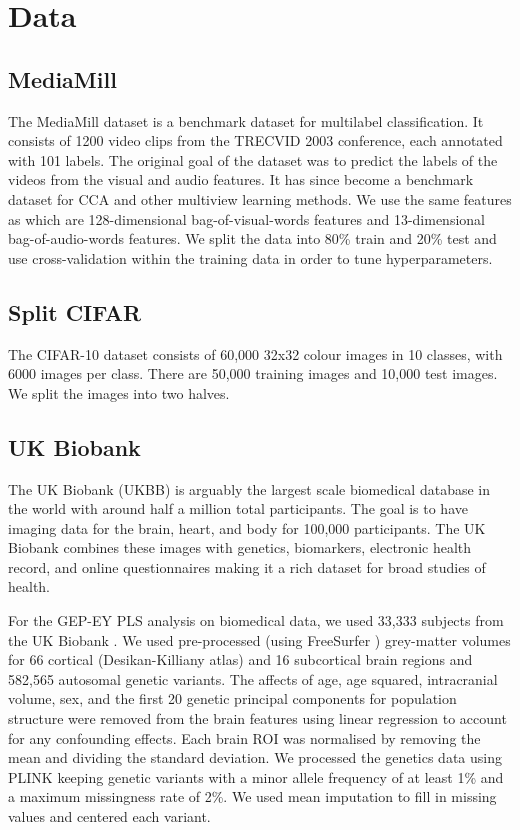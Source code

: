 \section{Data}
\subsection{MediaMill}
The MediaMill dataset \cite{feng2004context} is a benchmark dataset for multilabel classification. It consists of 1200 video clips from the TRECVID 2003 conference, each annotated with 101 labels. The original goal of the dataset was to predict the labels of the videos from the visual and audio features. It has since become a benchmark dataset for CCA and other multiview learning methods. We use the same features as \cite{gemp2022generalized} which are 128-dimensional bag-of-visual-words features and 13-dimensional bag-of-audio-words features. We split the data into 80\% train and 20\% test and use cross-validation within the training data in order to tune hyperparameters.

\subsection{Split CIFAR}
The CIFAR-10 dataset \cite{krizhevsky2009learning} consists of 60,000 32x32 colour images in 10 classes, with 6000 images per class. There are 50,000 training images and 10,000 test images. We split the images into two halves.

\subsection{UK Biobank}
The UK Biobank (UKBB) is arguably the largest scale biomedical database in the world with around half a million total participants. The goal is to have imaging data for the brain, heart, and body for 100,000 participants. The UK Biobank combines these images with genetics, biomarkers, electronic health record, and online questionnaires making it a rich dataset for broad studies of health.

For the GEP-EY PLS analysis on biomedical data, we used 33,333 subjects from the UK Biobank \cite{sudlow2015uk}. We used pre-processed (using FreeSurfer \cite{Fischl2012}) grey-matter volumes for 66 cortical (Desikan-Killiany atlas) and 16 subcortical brain regions and 582,565 autosomal genetic variants. The affects of age, age squared, intracranial volume, sex, and the first 20 genetic principal components for population structure were removed from the brain features using linear regression to account for any confounding effects. Each brain ROI was normalised by removing the mean and dividing the standard deviation. We processed the genetics data using PLINK \cite{Purcell2007} keeping genetic variants with a minor allele frequency of at least 1\%  and a maximum missingness rate of 2\%. We used mean imputation to fill in missing values and centered each variant. 

